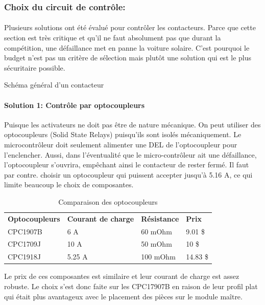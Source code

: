 	\subsubsection*{Choix du circuit de contrôle:}
		\paragraph*{}
		Plusieurs solutions ont été évalué pour contrôler les contacteurs. Parce que cette section est très critique et qu'il ne faut absolument pas que durant la compétition, une défaillance met en panne la voiture solaire. C'est pourquoi le budget n'est pas un critère de sélection mais plutôt une solution qui est le plus sécuritaire possible.

		Schéma général d'un contacteur 

		\paragraph*{Solution 1: Contrôle par optocoupleurs}
			
		Puisque les activateurs ne doit pas être de nature mécanique. On peut utiliser des optocoupleurs (Solid State Relays) puisqu'ils sont isolés mécaniquement. Le microcontrôleur doit seulement alimenter une DEL de l'optocoupleur pour l'enclencher. Aussi, dans l'éventualité que le micro-contrôleur ait une défaillance, l'optocoupleur s'ouvrira, empêchant ainsi le contacteur de rester fermé. Il faut par contre. choisir un optocoupleur qui puissent accepter jusqu'à 5.16 A, ce qui limite beaucoup le choix de composantes.
		
		\begin{table}[H]
			\centering
			\caption{Comparaison des optocoupleurs}
			\label{my-label}
			\begin{tabular}{|p{3cm}|p{3cm}|p{3cm}|p{3cm}|}
				\hline
				\textbf{Optocoupleurs} & \textbf{Courant de charge} & \textbf{Résistance} & \textbf{Prix}
				\\ \hhline{|=|=|=|=|}
				CPC1907B &
				6 A &
				60 mOhm &
				9.01 \$
				\\ \hline
				CPC1709J &
				10 A &
				50 mOhm &
				10 \$
				\\ \hline
				CPC1918J &
				5.25 A &
				100 mOhm &
				14.83 \$ 		
				\\ \hline
			\end{tabular}
		\end{table}
		
		Le prix de ces composantes est similaire et leur courant de charge est assez robuste. Le choix s'est donc faite sur les CPC17907B en raison de leur profil plat qui était plus avantageux avec le placement des pièces sur le module maître.
		
